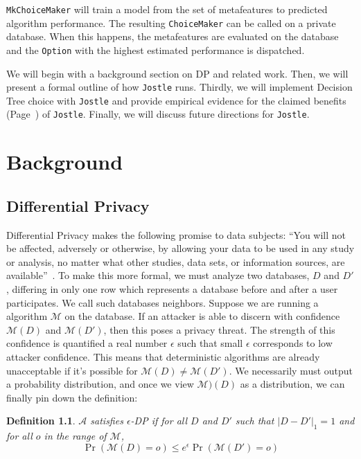 \documentclass[11pt]{report}
\newtheorem{defn}{Definition}
\newcommand{\Jostle}{\texttt{Jostle}}
\renewcommand{\t}[1]{\texttt{#1}}
\begin{document}
\t{MkChoiceMaker} will train a model from the set of metafeatures to predicted algorithm performance. The resulting \t{ChoiceMaker} can be called on a private database. When this happens, the metafeatures are evaluated on the database and the \t{Option} with the highest estimated performance is dispatched.

We will begin with a background section on DP and related work. Then, we will present a formal outline of how \Jostle{} runs. Thirdly, we will implement Decision Tree choice with \Jostle{} and provide empirical evidence for the claimed benefits (Page~\pageref{itm:adv_correct}) of \Jostle{}. Finally, we will discuss future directions for \Jostle{}.

\chapter{Background}\label{ch:background}
\section{Differential Privacy}
Differential Privacy makes the following promise to data subjects: ``You will not be affected, adversely or otherwise, by allowing your data to be used in any study or analysis, no matter what other studies, data sets, or information sources, are available''~\cite{Dwork:2006}. To make this more formal, we must analyze two databases, $D$ and $D'$, differing in only one row which represents a database before and after a user participates. We call such databases neighbors. Suppose we are running a algorithm $\mathcal{M}$ on the database. If an attacker is able to discern with confidence $\mathcal{M}(D)$ and $\mathcal{M}(D')$, then this poses a privacy threat. The strength of this confidence is quantified a real number $\epsilon$ such that small $\epsilon$ corresponds to low attacker confidence. This means that deterministic algorithms are already unacceptable if it's possible for $\mathcal{M}(D) \neq \mathcal{M}(D')$. We necessarily must output a probability distribution, and once we view $\mathcal{M})(D)$ as a distribution, we can finally pin down the definition:

\begin{defn}
$\mathcal{A}$ satisfies $\epsilon$-DP if for all $D$ and $D'$ such that $|D-D'|_1=1$ and for all $o$ in the range of $\mathcal{M}$, 
\[\Pr\left(\mathcal{M}(D) = o \right) \leq e^{\epsilon} \Pr\left(\mathcal{M}(D')=o\right)\]
\end{defn}
\end{document}
